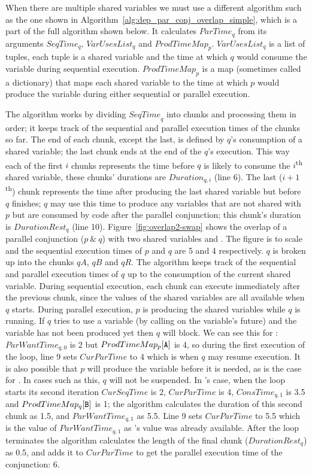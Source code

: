 When there are multiple shared variables we must use a different algorithm
such as the one shown in Algorithm~\ref{alg:dep_par_conj_overlap_simple},
which is a part of the full algorithm shown below.
It calculates $ParTime_q$ from its arguments $SeqTime_q$, $VarUsesList_q$ and
$ProdTimeMap_p$.
$VarUsesList_q$ is a list of tuples,
each tuple is a shared variable and the time at which $q$ would consume the
variable during sequential execution.
$ProdTimeMap_p$ is a map (sometimes called a dictionary)
that maps each shared variable to the time at which $p$ would produce the
variable during either sequential or parallel execution.


The algorithm works by dividing ${SeqTime}_q$ into chunks
and processing them in order;
it keeps track of the sequential and parallel execution times of the
chunks so far.
The end of each chunk, except the last, is defined by $q$'s consumption of a
shared variable;
the last chunk ends at the end of the $q$'s execution.
This way each of the first $i$ chunks represents the time before $q$ is likely to
consume the $i$\textsuperscript{th} shared variable,
these chunks' durations are $Duration_{q, i}$ (line 6).
The last ($i+1$\textsuperscript{th}) chunk represents the time after
producing the last shared variable but before $q$ finishes;
$q$ may use this time to produce any variables that are not shared with $p$
but are consumed by code after the parallel conjunction;
this chunk's duration is $DurationRest_q$ (line 10).
Figure~\ref{fig:overlap2-swap} shows the overlap of a parallel conjunction
($p~\&~q$) with two shared variables  and .
The figure is to scale and the sequential execution times of $p$ and $q$ are
5 and 4 respectively.
$q$ is broken up into the chunks $qA$, $qB$ and $qR$.
The algorithm keeps track of the sequential and parallel execution times of $q$
up to the consumption of the current shared variable.
During sequential execution,
each chunk can execute immediately after the previous chunk,
since the values of the shared variables are all available when $q$ starts.
During parallel execution,
$p$ is producing the shared variables while $q$ is running.
If $q$ tries to use a variable (by calling \wait on the variable's future)
and the variable has not been produced yet then $q$ will block.
We can see this for :
$ParWantTime_{q, 0}$ is 2 but $ProdTimeMap_p[\text{{\tt A}}]$ is 4,
so during the first execution of the loop,
line 9 sets $CurParTime$ to 4 which is when $q$ may resume execution.
It is also possible that $p$ will produce the variable before it is
needed, as is the case for .
In cases such as this, $q$ will not be suspended.
In 's case,
when the loop starts its second iteration $CurSeqTime$ is 2,
$CurParTime$ is 4, $ConsTime_{q, 1}$ is 3.5 and
$ProdTimeMap_q[\text{{\tt B}}]$ is 1;
the algorithm calculates the duration of this second chunk as 1.5,
and $ParWantTime_{q, 1}$ as 5.5.
Line 9 sets $CurParTime$ to 5.5 which is the value of $ParWantTime_{q, 1}$
as 's value was already available.
After the loop terminates the algorithm calculates the length of the final
chunk ($DurationRest_q$) as 0.5,
and adds it to $CurParTime$ to get the parallel execution time of the
conjunction: 6.

